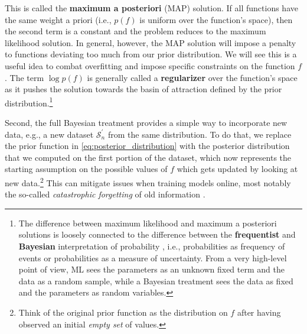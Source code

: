 This is called the \textbf{maximum a posteriori} (MAP) solution. If all functions have the same weight a priori (i.e., $p(f)$ is uniform over the function’s space), then the second term is a constant and the problem reduces to the maximum likelihood solution. In general, however, the MAP solution will impose a penalty to functions deviating too much from our prior distribution. We will see this is a useful idea to combat overfitting and impose specific constraints on the function $f$. The term $\log p(f)$ is generally called a \textbf{regularizer} over the function’s space as it pushes the solution towards the basin of attraction defined by the prior distribution.\footnote{The difference between maximum likelihood and maximum a posteriori solutions is loosely connected to the difference between the \textbf{frequentist} and \textbf{Bayesian} interpretation of probability \cite{hackenberger2019bayes}, i.e., probabilities as frequency of events or probabilities as a measure of uncertainty. From a very high-level point of view, ML sees the parameters as an unknown fixed term and the data as a random sample, while a Bayesian treatment sees the data as fixed and the parameters as random variables.} 

Second, the full Bayesian treatment provides a simple way to incorporate new data, e.g., a new dataset $\mathcal{S}^\prime_n$ from the same distribution. To do that, we replace the prior function in \eqref{eq:posterior_distribution} with the posterior distribution that we computed on the first portion of the dataset, which now represents the starting assumption on the possible values of $f$ which gets updated
by looking at new data.\footnote{Think of the original prior function as the distribution on $f$ after having observed an initial \textit{empty set} of values.} This can mitigate issues when training models online, most notably the so-called \textit{catastrophic forgetting} of old information \cite{kirkpatrick2017overcoming}.